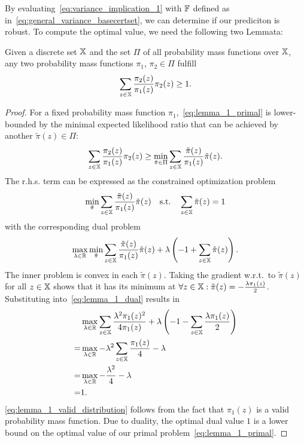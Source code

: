 By evaluating~\autoref{eq:variance_implication_1} with ${\mathbb{F}}$ defined as in~\autoref{eq:general_variance_basecertset}, we can determine if our prediciton is robust.
To compute the optimal value, we need the following two Lemmata:
\begin{lemma}\label{lemma_1}
Given a discrete set ${\mathbb{X}}$ and the set $\Pi$ of all probability mass functions over ${\mathbb{X}}$, 
any two probability mass functions $\pi_1$, $\pi_2 \in \Pi$ fulfill
\begin{equation}\label{eq:lemma_1_primal}
    \sum_{z \in {\mathbb{X}}} \frac{\pi_2(z)}{\pi_1(z)} \pi_2(z) \geq 1.
\end{equation}
\begin{proof}
For a fixed probability mass function $\pi_1$,~\autoref{eq:lemma_1_primal} is lower-bounded by the minimal expected likelihood ratio that can be achieved by another $\tilde{\pi}(z) \in \Pi$:
\begin{equation}
    \sum_{z \in {\mathbb{X}}} \frac{\pi_2(z)}{\pi_1(z)} \pi_2(z)
    \geq 
    \min_{\tilde{\pi} \in \Pi} \sum_{z \in {\mathbb{X}}} \frac{\tilde{\pi}(z)}{\pi_1(z)} \tilde{\pi}(z).
\end{equation}
The r.h.s. term can be expressed as the constrained optimization problem
\begin{equation}
    \min_{\tilde{\pi}} \sum_{z \in {\mathbb{X}}} \frac{\tilde{\pi}(z)}{\pi_1(z)} \tilde{\pi}(z)
    \quad
    \text{s.t.}
    \quad
    \sum_{z \in {\mathbb{X}}} \tilde{\pi}(z) = 1
\end{equation}
with the corresponding dual problem
\begin{equation}\label{eq:lemma_1_dual}
    \max_{\lambda \in {\mathbb{R}}}
    \min_{\tilde{\pi}} \sum_{z \in {\mathbb{X}}} \frac{\tilde{\pi}(z)}{\pi_1(z)} \tilde{\pi}(z)
    + \lambda
     \left(-1 + \sum_{z \in {\mathbb{X}}} \tilde{\pi}(z) \right).
\end{equation}
The inner problem is convex in each $\tilde{\pi}(z)$. Taking the gradient w.r.t.\ to $\tilde{\pi}(z)$ for all $z \in {\mathbb{X}}$ shows that it has its minimum at $\forall z \in {\mathbb{X}} : \tilde{\pi}(z) = - \frac{\lambda \pi_1(z)}{2}$. Substituting into~\autoref{eq:lemma_1_dual} results in 
\begin{align}
    & \max_{\lambda \in {\mathbb{R}}}
    \sum_{z \in {\mathbb{X}}} \frac{\lambda^2 \pi_1(z)^2}{4\pi_1(z)}
    + \lambda
    \left(-1 - \sum_{z \in {\mathbb{X}}} \frac{\lambda \pi_1(z)}{2}\right)
    \\
    = & 
    \max_{\lambda \in {\mathbb{R}}}
    - \lambda ^ 2
    \sum_{z \in {\mathbb{X}}} \frac{\pi_1(z)}{4} - \lambda
    \\\label{eq:lemma_1_valid_distribution}
    = & 
    \max_{\lambda \in {\mathbb{R}}}
    - \frac{\lambda ^ 2}{4} - \lambda
    \\ 
    = & 1.
\end{align}
\autoref{eq:lemma_1_valid_distribution} follows from the fact that $\pi_1(z)$ is a valid probability mass function.
Due to duality, the optimal dual value $1$ is a lower bound on the optimal value of our primal problem~\autoref{eq:lemma_1_primal}.
\end{proof}
\end{lemma}

